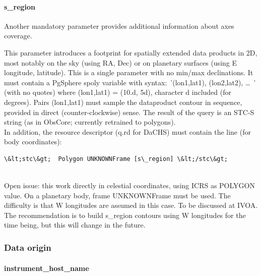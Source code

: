 \documentclass[11pt,a4paper]{ivoa}
\begin{document}
\paragraph{s\_region}



Another mandatory parameter provides additional information about axes coverage.

This parameter introduces a footprint for spatially extended data products in 2D, most notably on the sky (using RA, Dec) or on planetary surfaces (using E longitude, latitude). This is a single parameter with no min/max declinations. It must contain a PgSphere spoly variable with syntax: '{(lon1,lat1), (lon2,lat2), … }' (with no quotes) where (lon1,lat1) = (10.d, 5d), character d included (for degrees). Pairs (lon1,lat1) must sample the dataproduct contour in sequence, provided in direct (counter-clockwise) sense. The result of the query is an STC-S string (as in ObsCore; currently retrained to polygons).\\

In addition, the resource descriptor (q.rd for DaCHS) must contain the line (for body coordinates):








\begin{verbatim}\&lt;stc\&gt;  Polygon UNKNOWNFrame [s\_region] \&lt;/stc\&gt;\end{verbatim}






\\

Open issue: this work directly in celestial coordinates, using ICRS as POLYGON value. On a planetary body, frame UNKNOWNFrame must be used. The difficulty is that W longitudes are assumed in this case. To be discussed at IVOA. The recommendation is to build s\_region contours using W longitudes for the time being, but this will change in the future.

\subsubsection{Data origin}

\paragraph{instrument\_host\_name}
\end{document}
